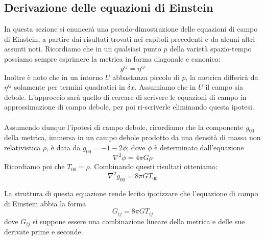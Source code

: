 \documentclass[]{report}
\theoremstyle{definition}
\theoremstyle{Theorem}
\theoremstyle{definition}
\theoremstyle{definition}
\theoremstyle{definition}
\begin{document}
\subsection{Derivazione delle equazioni di Einstein}
In questa sezione si enuncerà una pseudo-dimostrazione delle equazioni di campo di Einstein, a partire dai risultati trovati nei capitoli precedenti e da alcuni altri assunti noti.
Ricordiamo che in un qualsiasi punto $p$ della varietà spazio-tempo possiamo sempre esprimere la metrica in forma diagonale e canonica:
$$g^{ij}=\eta^{ij}$$
Inoltre è noto che in un intorno $U$ abbastanza piccolo di $p$, la metrica differirà da $\eta^{ij}$ solamente per termini quadratici in $\delta x$. Assumiamo che in $U$ il campo sia debole. L'approccio sarà quello di cercare di scrivere le equazioni di campo in approssimazione di campo debole, per poi ri-scriverle eliminando questa ipotesi.\\
\\
Assumendo dunque l'ipotesi di campo debole, ricordiamo che la componente $g_{00}$ della metrica, immersa in un campo debole prodotto da una densità di massa non relativistica $\rho$, è data da $g_{00}=-1-2\phi$; dove $\phi$ è determinato dall'equazione $$\nabla^2\phi=4\pi G\rho$$
Ricordiamo poi che $T_{00}=\rho$. Combinando questi risultati otteniamo:
\begin{equation}\label{Equation 1}
	\nabla^2g_{00}=8\pi GT_{00}
\end{equation}

La struttura di questa equazione rende lecito ipotizzare che l'equazione di campo di Einstein abbia la forma 
$$G_{ij}=8\pi GT_{ij}$$
dove $G_{ij}$ si suppone essere una combinazione lineare della metrica e delle sue derivate prime e seconde.
\end{document}
